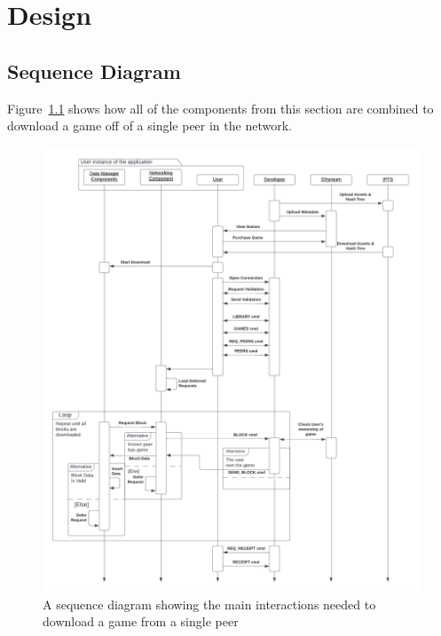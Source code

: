 \chapter{Design}






\newpage
\section{Sequence Diagram}

Figure~\ref{fig:p2p-interactions} shows how all of the components from this section are combined to download a game off of a single peer in the network.

\begin{figure}[H]
  \centering\hspace{-16.5mm}
  \includegraphics[width=1.1\textwidth]{assets/images/diagrams/p2p-sequence.png}
  \caption{A sequence diagram showing the main interactions needed to download a game from a single peer}
  \label{fig:p2p-interactions}
\end{figure}
